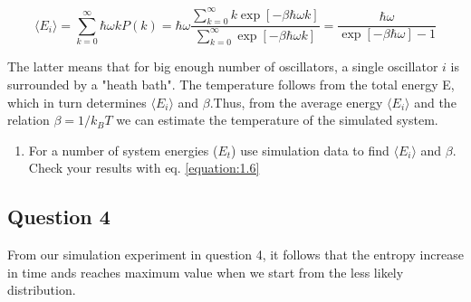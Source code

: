 \documentclass[10pt]{article}
\begin{document}
\begin{equation} %
   \langle E_i\rangle=\sum_{k=0}^{\infty}\hbar\omega kP(k)=\hbar\omega\frac{\sum_{k=0}^{\infty}k\exp[-\beta \hbar\omega k]}{\sum_{k=0}^{\infty}\exp[-\beta \hbar\omega k]}=\frac{\hbar\omega}{\exp[-\beta \hbar\omega ]-1}
   \label{equation:1.6} 
\end{equation}
%

The latter means that for big enough number of oscillators, a single oscillator $i$ is surrounded by a "heath bath". The temperature follows from the total energy E, which in turn determines  $ \langle E_i\rangle$ and $\beta$.Thus, from the average energy $ \langle E_i\rangle$ and the relation $\beta=1/k_BT$ we can estimate the temperature of the simulated system. 

\begin{enumerate}
\item For a number of system energies ($E_t$) use simulation data to find $ \langle E_i\rangle$ and $\beta$. Check your results with eq. \eqref{equation:1.6} 
\end{enumerate}


\subsection{Question 4}
From our simulation experiment in question 4, it follows that the entropy increase in time ands  reaches maximum value when we start from the less likely distribution.




\end{document}

